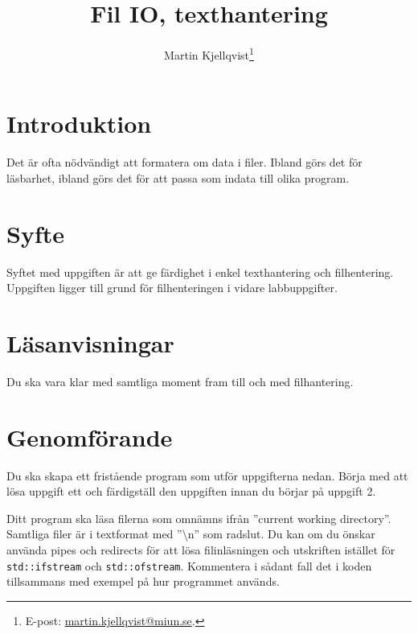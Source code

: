 \documentclass[a4paper]{miunasgn}
\title{Fil IO, texthantering}
\author{Martin Kjellqvist\footnote{%
	E-post: \href{mailto:martin.kjellqvist@miun.se}{martin.kjellqvist@miun.se}.
}}
\begin{document}
\maketitle
\thispagestyle{foot}

\section{Introduktion}
\label{sec:Introduktion}
\noindent
Det är ofta nödvändigt att formatera om data i filer.
Ibland görs det för läsbarhet, ibland görs det för att passa som indata till 
olika program.

\section{Syfte}
\label{sec:Syfte}
\noindent
Syftet med uppgiften är att ge färdighet i enkel texthantering och 
filhentering.
Uppgiften ligger till grund för filhenteringen i vidare labbuppgifter.

\section{Läsanvisningar}
\label{sec:Lasanvisningar}
\noindent
%
Du ska vara klar med samtliga moment fram till och med filhantering. 

\section{Genomförande}
\label{sec:Genomforande}
\noindent
Du ska skapa ett fristående program som utför uppgifterna nedan.
Börja med att lösa uppgift ett och färdigställ den uppgiften innan du
börjar på uppgift 2.

Ditt program ska läsa filerna som omnämns ifrån ''current working directory''.
Samtliga filer är i textformat med ''\textbackslash{}n'' som radslut.
Du kan om du önskar använda pipes och redirects för att lösa filinläsningen och 
utskriften istället för \texttt{std::ifstream} och \texttt{std::ofstream}.
Kommentera i sådant fall det i koden tillsammans med exempel på hur programmet 
används.
\end{document}
